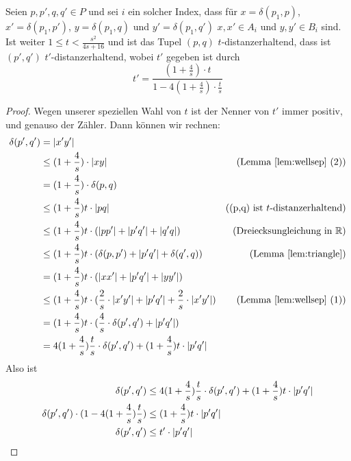     \begin{lemma}
    	\label{lem:stranget}
    	Seien $p, p', q, q' \in P$ und sei $i$ ein solcher Index, dass für $x = \delta(p_1, p)$, $x' = \delta(p_1, p')$, $y = \delta(p_1, q)$ und $y' = \delta(p_1, q')$ $x, x' \in A_i$ und $y, y' \in B_i$ sind. Ist weiter $1 \leq t < \frac{s^2}{4s + 16}$ und ist das Tupel $(p, q)$ $t$-distanzerhaltend, dass ist $(p', q')$ $t'$-distanzerhaltend, wobei $t'$ gegeben ist durch 
    	\[t' = \frac{(1+\frac{4}{s})\cdot t}{1 - 4(1 + \frac{4}{s})\cdot\frac{t}{s}}\]
    \end{lemma}
    \begin{proof}
    	Wegen unserer speziellen Wahl von $t$ ist der Nenner von $t'$ immer positiv, und genauso der Zähler. Dann können wir rechnen:
    	\begin{align*}
	    	\delta(p', q') &= |x'y'| 
	    	\\ &\leq (1 + \frac{4}{s})\cdot|xy| & \text{(Lemma \ref{lem:wellsep} (2))}
	    	\\ &= (1 + \frac{4}{s})\cdot\delta(p, q)
	    	\\ &\leq (1 + \frac{4}{s})t\cdot |pq| & \text{((p,q) ist $t$-distanzerhaltend)}
	    	\\ &\leq (1 + \frac{4}{s})t\cdot (|pp'| + |p'q'| + |q'q|) & \text{(Dreiecksungleichung in $\mathbb{R}$)}
	    	\\ &\leq (1 + \frac{4}{s})t\cdot (\delta(p,p') + |p'q'| + \delta(q', q)) & \text{(Lemma \ref{lem:triangle})}
	    	\\ &= (1 + \frac{4}{s})t\cdot (|xx'| + |p'q'| + |yy'|)
	    	\\ &\leq (1 + \frac{4}{s})t\cdot (\frac{2}{s}\cdot|x'y'| + |p'q'| + \frac{2}{s}\cdot|x'y'|) & \text{(Lemma \ref{lem:wellsep} (1))}
	    	\\ &= (1 + \frac{4}{s})t\cdot (\frac{4}{s}\cdot\delta(p',q') + |p'q'|)
	    	\\ &= 4(1 + \frac{4}{s})\frac{t}{s}\cdot \delta(p',q') + (1 + \frac{4}{s})t\cdot|p'q'|
    	\end{align*}
    	Also ist
    	\begin{align*}
	    	\delta(p', q') &\leq 4(1 + \frac{4}{s})\frac{t}{s}\cdot \delta(p',q') + (1 + \frac{4}{s})t\cdot|p'q'|
	    	\\ \delta(p', q') \cdot (1 - 4(1 + \frac{4}{s})\frac{t}{s}) &\leq (1 + \frac{4}{s})t\cdot|p'q'| \tag*{\llap{\makebox[\linewidth][l]{$\Leftrightarrow$}}}
	    	\\ \delta(p',q') &\leq t' \cdot |p'q'| \tag*{\llap{\makebox[\linewidth][l]{$\Leftrightarrow$}}}
    	\end{align*}
    \end{proof}
    
